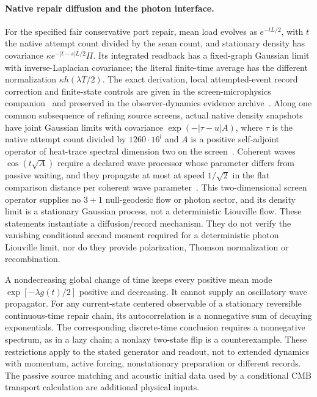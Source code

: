 \documentclass[11pt]{article}
\theoremstyle{remark}
\begin{document}
\paragraph{Native repair diffusion and the photon interface.}
For the specified fair conservative port repair, mean load evolves as
\(e^{-tL/2}\), with \(t\) the native attempt count divided by the seam
count, and stationary density has covariance
\(\kappa e^{-|t-s|L/2}\Pi\). Its integrated readback has a
fixed-graph Gaussian limit with inverse-Laplacian covariance; the literal
finite-time average has the different normalization
\(\kappa h(\lambda T/2)\). The exact derivation, local attempted-event
record correction and finite-state controls are given in the
screen-microphysics companion~\cite{ophmicro} and preserved in the
observer-dynamics evidence archive~\cite{ophobsdyn}.
Along one common subsequence of refining source screens, actual native
density snapshots have joint Gaussian limits with covariance
\(\exp(-|\tau-u|A)\), where \(\tau\) is the native attempt count divided
by \(1260\cdot16^{l}\) and \(A\) is a positive self-adjoint operator of
heat-trace spectral dimension two on the
screen~\cite{ophtimefields,ophcontinuum}. Coherent waves
\(\cos(t\sqrt A)\) require a declared wave processor whose parameter differs
from passive waiting, and they propagate at most at speed \(1/\sqrt2\) in the
flat comparison distance per coherent wave parameter~\cite{ophmodel}. This two-dimensional screen
operator supplies no \(3+1\) null-geodesic flow or photon sector, and its
density limit is a stationary Gaussian process, not a deterministic
Liouville flow.
These statements instantiate a diffusion/record mechanism. They do not
verify the vanishing conditional second moment required for a deterministic
photon Liouville limit, nor do they provide polarization, Thomson
normalization or recombination.

A nondecreasing global change of time keeps every positive mean mode
\(\exp[-\lambda g(t)/2]\) positive and decreasing. It cannot supply an
oscillatory wave propagator. For any current-state centered observable of
a stationary reversible continuous-time repair chain, its autocorrelation
is a nonnegative sum of decaying exponentials. The corresponding
discrete-time conclusion requires a nonnegative spectrum, as in a lazy
chain; a nonlazy two-state flip is a counterexample. These restrictions
apply to the stated generator and readout, not to extended dynamics with
momentum, active forcing, nonstationary preparation or different records.
The passive source matching and acoustic initial data used by a conditional
CMB transport calculation are additional physical inputs.
\end{document}
